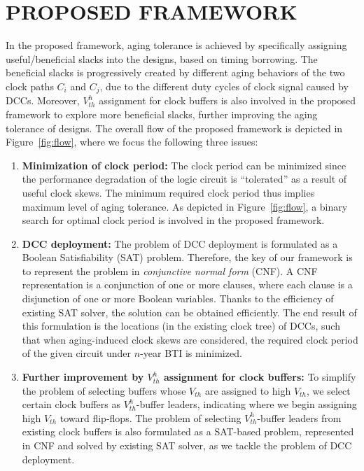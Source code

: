 \section{PROPOSED FRAMEWORK}
\label{sec:framework}
In the proposed framework, aging tolerance is achieved by specifically assigning useful/beneficial slacks into the designs, based on timing borrowing. The beneficial slacks is progressively created by different aging behaviors of the two clock paths $C_{i}$ and $C_{j}$, due to the different duty cycles of clock signal caused by DCCs. Moreover, $V_{th}^h$ assignment for clock buffers is also involved in the proposed framework to explore more beneficial slacks, further improving the aging tolerance of designs.
The overall flow of the proposed framework is depicted in Figure~\ref{fig:flow}, where we focus the following three issues:
\begin{enumerate}[leftmargin=*]
	\item \textbf{Minimization of clock period:} The clock period can be minimized since the performance degradation of the logic circuit is \enquote{tolerated} as a result of useful clock skews. The minimum required clock period thus implies maximum level of aging tolerance. As depicted in Figure~\ref{fig:flow}, a binary search for optimal clock period is involved in the proposed framework.
	\item \textbf{DCC deployment:} The problem of  DCC deployment is formulated as a Boolean Satisfiability (SAT) problem. Therefore, the key of our framework is to represent the problem in \textit{conjunctive normal form} (CNF). A CNF representation is a conjunction of one or more clauses, where each clause is a disjunction of one or more Boolean variables. Thanks to the efficiency of existing SAT solver, the solution can be obtained efficiently. The end result of this formulation is the locations (in the existing clock tree) of DCCs, such that when aging-induced clock skews are considered, the required clock period of the given circuit under $n$-year BTI is minimized. 
	\item \textbf{Further improvement by $V_{th}^h$ assignment for clock buffers:} To simplify the problem of selecting buffers whose $V_{th}$ are assigned to high $V_{th}$, we select certain clock buffers as $V_{th}^h$-buffer leaders, indicating where we begin assigning high $V_{th}$ toward flip-flops. The problem of selecting $V_{th}^h$-buffer leaders from existing clock buffers is also formulated as a SAT-based problem, represented in CNF and solved by existing SAT solver, as we tackle the problem of DCC deployment.
\end{enumerate}

